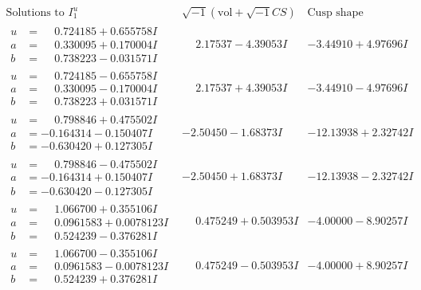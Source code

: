 \documentclass[1p]{elsarticle_modified}
\theoremstyle{definition}
\newcommand{\I}{\sqrt{-1}}
\begin{document}
$$\begin{array}{c|c|c}  
\text{Solutions to }I^u_{1}& \I (\text{vol} + \sqrt{-1}CS) & \text{Cusp shape}\\
 \hline 
\begin{aligned}
u &= \phantom{-}0.724185 + 0.655758 I \\
a &= \phantom{-}0.330095 + 0.170004 I \\
b &= \phantom{-}0.738223 - 0.031571 I\end{aligned}
 & \phantom{-}2.17537 - 4.39053 I & -3.44910 + 4.97696 I \\ \hline\begin{aligned}
u &= \phantom{-}0.724185 - 0.655758 I \\
a &= \phantom{-}0.330095 - 0.170004 I \\
b &= \phantom{-}0.738223 + 0.031571 I\end{aligned}
 & \phantom{-}2.17537 + 4.39053 I & -3.44910 - 4.97696 I \\ \hline\begin{aligned}
u &= \phantom{-}0.798846 + 0.475502 I \\
a &= -0.164314 - 0.150407 I \\
b &= -0.630420 + 0.127305 I\end{aligned}
 & -2.50450 - 1.68373 I & -12.13938 + 2.32742 I \\ \hline\begin{aligned}
u &= \phantom{-}0.798846 - 0.475502 I \\
a &= -0.164314 + 0.150407 I \\
b &= -0.630420 - 0.127305 I\end{aligned}
 & -2.50450 + 1.68373 I & -12.13938 - 2.32742 I \\ \hline\begin{aligned}
u &= \phantom{-}1.066700 + 0.355106 I \\
a &= \phantom{-}0.0961583 + 0.0078123 I \\
b &= \phantom{-}0.524239 - 0.376281 I\end{aligned}
 & \phantom{-}0.475249 + 0.503953 I & -4.00000 - 8.90257 I \\ \hline\begin{aligned}
u &= \phantom{-}1.066700 - 0.355106 I \\
a &= \phantom{-}0.0961583 - 0.0078123 I \\
b &= \phantom{-}0.524239 + 0.376281 I\end{aligned}
 & \phantom{-}0.475249 - 0.503953 I & -4.00000 + 8.90257 I \\ \hline\begin{aligned}

\end{aligned}
\end{array}$$
\end{document}
